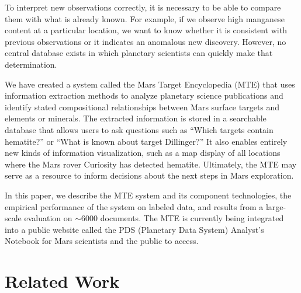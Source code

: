 \documentclass[letterpaper]{article} %
\begin{document}
To interpret new observations correctly, it is necessary to be able to
compare them with what is already known.  For example, if we observe
high manganese content at a particular location, we want to know
whether it is consistent with previous observations or it indicates an
anomalous new discovery.  However, no central database exists in which
planetary scientists can quickly make that determination.

We have created a system called the Mars Target Encyclopedia (MTE)
that uses information extraction methods to analyze planetary science
publications and identify stated compositional relationships between Mars
surface targets and elements or minerals.  The extracted information
is stored in a searchable database that allows users to ask questions
such as ``Which targets contain hematite?'' or ``What is known about
target Dillinger?''  It also enables entirely new kinds of information
visualization, such as a map display of all locations where the Mars
rover Curiosity has detected hematite.  Ultimately, the MTE may serve 
as a resource to inform
decisions about the next steps in Mars exploration.  


In this paper, we describe the MTE system and its component
technologies, the empirical performance of the system on labeled data,
and results from a large-scale evaluation on $\sim$6000 documents.
The MTE is currently being integrated into a public website called the
PDS (Planetary Data System) Analyst's Notebook for Mars scientists
and the public to access.


\section{Related Work}
\end{document}
